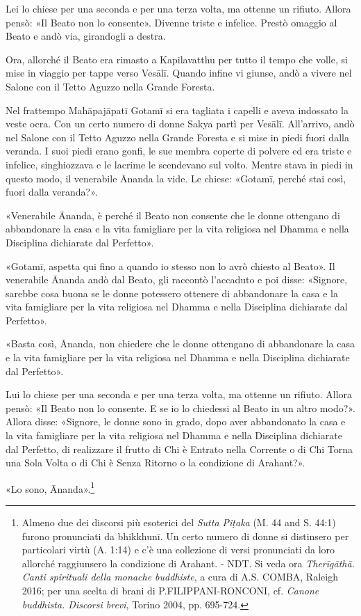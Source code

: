 Lei lo chiese per una seconda e per una terza volta, ma ottenne un rifiuto.
Allora pensò: «Il Beato non lo consente». Divenne triste e infelice. Prestò
omaggio al Beato e andò via, girandogli a destra.

Ora, allorché il Beato era rimasto a Kapilavatthu per tutto il tempo che volle,
si mise in viaggio per tappe verso Vesālī. Quando infine vi giunse, andò a
vivere nel Salone con il Tetto Aguzzo nella Grande Foresta.

Nel frattempo Mahāpajāpatī Gotamī si era tagliata i capelli e aveva indossato la
veste ocra. Con un certo numero di donne Sakya partì per Vesālī. All’arrivo,
andò nel Salone con il Tetto Aguzzo nella Grande Foresta e si mise in piedi
fuori dalla veranda. I suoi piedi erano gonfi, le sue membra coperte di polvere
ed era triste e infelice, singhiozzava e le lacrime le scendevano sul volto.
Mentre stava in piedi in questo modo, il venerabile Ānanda la vide. Le chiese:
«Gotamī, perché stai così, fuori dalla veranda?».

«Venerabile Ānanda, è perché il Beato non consente che le donne ottengano di
abbandonare la casa e la vita famigliare per la vita religiosa nel Dhamma e
nella Disciplina dichiarate dal Perfetto».

«Gotamī, aspetta qui fino a quando io stesso non lo avrò chiesto al Beato». Il
venerabile Ānanda andò dal Beato, gli raccontò l’accaduto e poi disse: «Signore,
sarebbe cosa buona se le donne potessero ottenere di abbandonare la casa e la
vita famigliare per la vita religiosa nel Dhamma e nella Disciplina dichiarate
dal Perfetto».

«Basta così, Ānanda, non chiedere che le donne ottengano di abbandonare la casa
e la vita famigliare per la vita religiosa nel Dhamma e nella Disciplina
dichiarate dal Perfetto».

Lui lo chiese per una seconda e per una terza volta, ma ottenne un rifiuto.
Allora pensò: «Il Beato non lo consente. E se io lo chiedessi al Beato in un
altro modo?». Allora disse: «Signore, le donne sono in grado, dopo aver
abbandonato la casa e la vita famigliare per la vita religiosa nel Dhamma e
nella Disciplina dichiarate dal Perfetto, di realizzare il frutto di Chi è
Entrato nella Corrente o di Chi Torna una Sola Volta o di Chi è Senza Ritorno o
la condizione di Arahant?».

«Lo sono, Ānanda».\footnote{Almeno due dei discorsi più esoterici del
  \emph{Sutta Piṭaka} (M. 44 and S. 44:1) furono pronunciati da bhikkhunī. Un
  certo numero di donne si distinsero per particolari virtù (A. 1:14) e c’è una
  collezione di versi pronunciati da loro allorché raggiunsero la condizione di
  Arahant. - NDT. Si veda ora \emph{Therīgāthā. Canti spirituali della monache
    buddhiste}, a cura di A.S. COMBA, Raleigh 2016; per una scelta di brani di
  P.FILIPPANI-RONCONI, cf. \emph{Canone buddhista. Discorsi brevi}, Torino 2004,
  pp. 695-724.}

